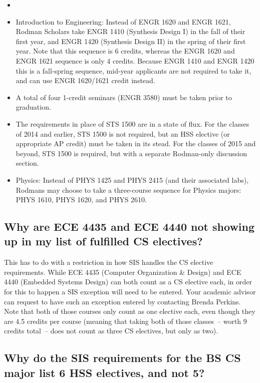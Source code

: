 \documentclass[10pt,letter]{book}
\newenvironment{itemlist}{
\begin{itemize}
\setlength{\itemsep}{0pt}
\setlength{\parskip}{0pt}}
{\end{itemize}}
\newcommand{\sisexceptionenterer}{Brenda Perkins}
\begin{document}
\begin{itemlist}
\item 
\item Introduction to Engineering: Instead of ENGR 1620 and ENGR 1621,
  Rodman Scholars take ENGR 1410 (Synthesis Design I) in the fall of
  their first year, and ENGR 1420 (Synthesis Design II) in the spring
  of their first year.  Note that this sequence is 6 credits, whereas
  the ENGR 1620 and ENGR 1621 sequence is only 4 credits.  Because
  ENGR 1410 and ENGR 1420 this is a fall-spring sequence, mid-year
  applicants are not required to take it, and can use ENGR 1620/1621
  credit instead.
\item A total of four 1-credit seminars (ENGR 3580) must be taken
  prior to graduation.
\item The requirements in place of STS 1500 are in a state of flux.
  For the classes of 2014 and earlier, STS 1500 is not required, but
  an HSS elective (or appropriate AP credit) must be taken in its
  stead.  For the classes of 2015 and beyond, STS 1500 is required,
  but with a separate Rodman-only discussion section.
\item Physics: Instead of PHYS 1425 and PHYS 2415 (and their
  associated labs), Rodmans may choose
  to take a three-course sequence for Physics majors: PHYS 1610, PHYS
  1620, and PHYS 2610.
\end{itemlist}

\subsection{Why are ECE 4435 and ECE 4440 not showing up in my list of
  fulfilled CS electives?}
\label{sec:sisece4435issue}

This has to do with a restriction in how SIS handles the CS elective
requirements.  While ECE 4435 (Computer Organization \& Design)
and ECE 4440 (Embedded Systems Design) can both count as a CS
elective each, in order for this to happen a SIS exception will need
to be entered.  Your academic advisor can request to have such an
exception entered by contacting \sisexceptionenterer.  Note that both
of those courses only count as one elective each, even though they are
4.5 credits per course (meaning that taking both of those classes~--
worth 9 credits total~-- does not count as three CS electives, but
only as two).

\subsection{Why do the SIS requirements for the BS CS major list 6 HSS
  electives, and not 5?}
\label{sec:sishssissue}
\end{document}
